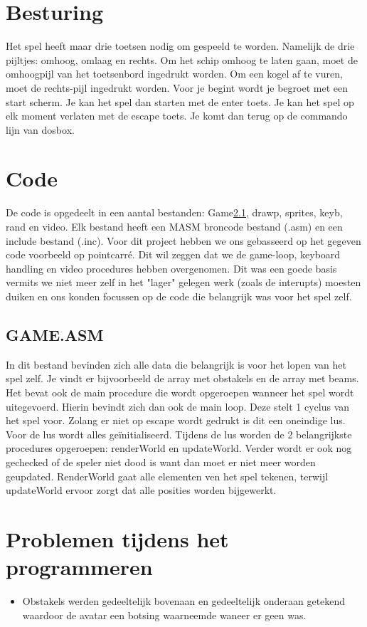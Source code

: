 \documentclass{article}
\begin{document}
\section{Besturing}

Het spel heeft maar drie toetsen nodig om gespeeld te worden. Namelijk de drie pijltjes: omhoog, omlaag en rechts.
Om het schip omhoog te laten gaan, moet de omhoogpijl van het toetsenbord ingedrukt worden.
Om een kogel af te vuren, moet de rechts-pijl ingedrukt worden.
Voor je begint wordt je begroet met een start scherm. Je kan het spel dan starten met de enter toets. 
Je kan het spel op elk moment verlaten met de escape toets. Je komt dan terug op de commando lijn van dosbox.

\section{Code}
De code is opgedeelt in een aantal bestanden: Game\ref{game_asm}, drawp, sprites, keyb, rand en video. Elk bestand heeft een MASM broncode bestand (.asm) en een include bestand (.inc).
Voor dit project hebben we ons gebasseerd op het gegeven code voorbeeld op pointcarr\'e. Dit wil zeggen dat we de game-loop, keyboard handling en video procedures hebben overgenomen. 
Dit was een goede basis vermits we niet meer zelf in het "lager" gelegen werk (zoals de interupts) moesten duiken en ons konden focussen op de code die belangrijk was voor het spel zelf.

\subsection{GAME.ASM}\label{game_asm}
In dit bestand bevinden zich alle data die belangrijk is voor het lopen van het spel zelf. Je vindt er bijvoorbeeld de array met obstakels en de array met beams.
Het bevat ook de main procedure die wordt opgeroepen wanneer het spel wordt uitegevoerd. Hierin bevindt zich dan ook de main loop. Deze stelt 1 cyclus van het spel voor.
Zolang er niet op escape wordt gedrukt is dit een oneindige lus. Voor de lus wordt alles geïnitialiseerd. Tijdens de lus worden de 2 belangrijkste procedures opgeroepen: renderWorld en updateWorld. 
Verder wordt er ook nog gechecked of de speler niet dood is want dan moet er niet meer worden geupdated.
RenderWorld gaat alle elementen ven het spel tekenen, terwijl updateWorld ervoor zorgt dat alle posities worden bijgewerkt. 


\section{Problemen tijdens het programmeren}\label{problems}
\begin {itemize}
\item Obstakels werden gedeeltelijk bovenaan en gedeeltelijk onderaan getekend waardoor de avatar een botsing waarneemde waneer er geen was.
\end {itemize}
\end{document}
